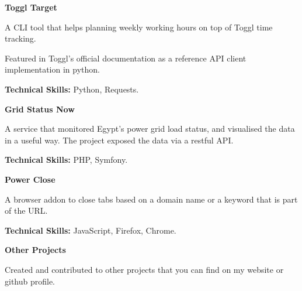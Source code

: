 
\begin{cventries}
	\cventry
	{\textbf{Toggl Target}} %
	{} %
	{} %
	{} %
	{
		\begin{cvitems} %
			\item {A CLI tool that helps planning weekly working hours on top of Toggl time tracking.}
			\item {Featured in Toggl's official documentation as a reference API client implementation in python.}
			\item {\textbf{Technical Skills:} Python, Requests.}
		\end{cvitems}
	}

	\cventry
	{\textbf{Grid Status Now}} %
	{} %
	{} %
	{} %
	{
		\begin{cvitems} %
			\item {A service that monitored Egypt’s power grid load status, and visualised the data in a useful way. The
			            project exposed the data via a restful API.}
			\item {\textbf{Technical Skills:} PHP, Symfony.}
		\end{cvitems}
	}

	\cventry
	{\textbf{Power Close}} %
	{} %
	{} %
	{} %
	{
		\begin{cvitems} %
			\item {A browser addon to close tabs based on a domain name or a keyword that is part of the URL.}
			\item {\textbf{Technical Skills:} JavaScript, Firefox, Chrome.}
		\end{cvitems}
	}

	\cventry
	{\textbf{Other Projects}} %
	{} %
	{} %
	{} %
	{
		\begin{cvitems} %
			\item {Created and contributed to other projects that you can find on my website or github profile.}
		\end{cvitems}
	}
\end{cventries}
